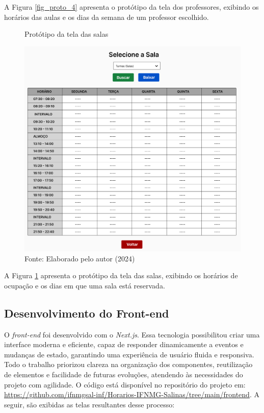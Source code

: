 A Figura \ref{fig_proto_4} apresenta o protótipo da tela dos professores, exibindo os horários das aulas e os dias da semana de um professor escolhido.

\begin{figure}[H]
    \centering
    \caption{Protótipo da tela das salas}
    \includegraphics[width=1\textwidth]{Figuras/proto-5.PNG}
    \caption*{Fonte: Elaborado pelo autor (2024)}
    \label{fig_proto_5}
\end{figure}

A Figura \ref{fig_proto_5} apresenta o protótipo da tela das salas, exibindo os horários de ocupação e os dias em que uma sala está reservada.

\subsection{Desenvolvimento do Front-end}

O \textit{front-end} foi desenvolvido com o \textit{Next.js}. Essa tecnologia possibilitou criar uma interface moderna e eficiente, capaz de responder dinamicamente a eventos e mudanças de estado, garantindo uma experiência de usuário fluida e responsiva. Todo o trabalho priorizou clareza na organização dos componentes, reutilização de elementos e facilidade de futuras evoluções, atendendo às necessidades do projeto com agilidade. O código está disponível no repositório do projeto em: \url{https://github.com/ifnmgsal-inf/Horarios-IFNMG-Salinas/tree/main/frontend}. A seguir, são exibidas as telas resultantes desse processo:

